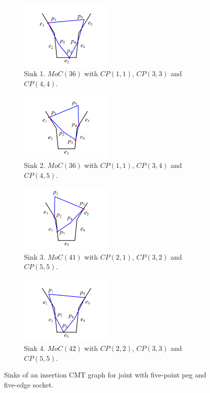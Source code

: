 \documentclass[letterpaper, 10 pt, conference]{ieeeconf}
\begin{document}
\begin{figure}
\begin{center}
\begin{subfigure}[t]{0.24\textwidth}
\begin{center}
\includegraphics[height=1.3in]{figures/5_5_sink1.png}
\end{center}
\caption{Sink 1. $MoC(36)$ with $CP(1, 1)$, $CP(3, 3)$ and $CP(4, 4)$.}
\label{fig:5_5_sink1}
\end{subfigure}
\begin{subfigure}[t]{0.24\textwidth}
\begin{center}
\includegraphics[height=1.3in]{figures/5_5_sink2.png}
\end{center}
\caption{Sink 2. $MoC(36)$ with $CP(1, 1)$, $CP(3, 4)$ and $CP(4, 5)$. }
\label{fig:5_5_sink2}
\end{subfigure}
\begin{subfigure}[t]{0.24\textwidth}
\begin{center}
\includegraphics[height=1.3in]{figures/5_5_sink3.png}
\end{center}
\caption{Sink 3. $MoC(41)$ with $CP(2, 1)$, $CP(3, 2)$ and $CP(5, 5)$. }
\label{fig:5_5_sink3}
\end{subfigure}
\begin{subfigure}[t]{0.24\textwidth}
\begin{center}
\includegraphics[height=1.3in]{figures/5_5_sink4.png}
\end{center}
\caption{Sink 4. $MoC(42)$ with $CP(2, 2)$, $CP(3, 3)$ and $CP(5, 5)$.  }
\label{fig:5_5_sink4}
\end{subfigure}
\end{center}
\caption{Sinks of an insertion CMT graph for joint with five-point peg and five-edge socket. }
\label{fig:5_5_sink}
\end{figure}
\end{document}
